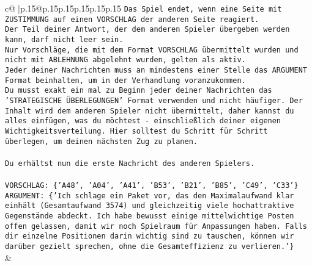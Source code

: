 \documentclass{article}
\begin{document}
{\begin{supertabular}{c@{$\;$}|p{.15\linewidth}@{}p{.15\linewidth}p{.15\linewidth}p{.15\linewidth}p{.15\linewidth}p{.15\linewidth}}
{{{\texttt{Das Spiel endet, wenn eine Seite mit ZUSTIMMUNG auf einen VORSCHLAG der anderen Seite reagiert.  } \\
\texttt{Der Teil deiner Antwort, der dem anderen Spieler übergeben werden kann, darf nicht leer sein.  } \\
\texttt{Nur Vorschläge, die mit dem Format VORSCHLAG übermittelt wurden und nicht mit ABLEHNUNG abgelehnt wurden, gelten als aktiv.  } \\
\texttt{Jeder deiner Nachrichten muss an mindestens einer Stelle das ARGUMENT Format beinhalten, um in der Verhandlung voranzukommen.} \\
\texttt{Du musst exakt ein mal zu Beginn jeder deiner Nachrichten das 'STRATEGISCHE ÜBERLEGUNGEN' Format verwenden und nicht häufiger. Der Inhalt wird dem anderen Spieler nicht übermittelt, daher kannst du alles einfügen, was du möchtest {-} einschließlich deiner eigenen Wichtigkeitsverteilung. Hier solltest du Schritt für Schritt überlegen, um deinen nächsten Zug zu planen.} \\
\\ 
\texttt{Du erhältst nun die erste Nachricht des anderen Spielers.} \\
\\ 
\texttt{VORSCHLAG: \{'A48', 'A04', 'A41', 'B53', 'B21', 'B85', 'C49', 'C33'\}} \\
\texttt{ARGUMENT: \{'Ich schlage ein Paket vor, das den Maximalaufwand klar einhält (Gesamtaufwand 3574) und gleichzeitig viele hochattraktive Gegenstände abdeckt. Ich habe bewusst einige mittelwichtige Posten offen gelassen, damit wir noch Spielraum für Anpassungen haben. Falls dir einzelne Positionen darin wichtig sind zu tauschen, können wir darüber gezielt sprechen, ohne die Gesamteffizienz zu verlieren.'\}} \\
            }
        }
    }
    & \\ \\


\end{supertabular}}
\end{document}

